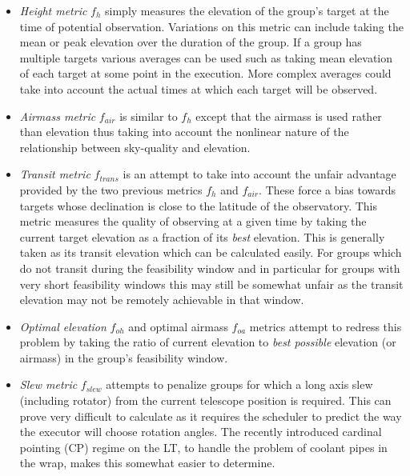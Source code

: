 \begin{itemize}
 
\item \emph{Height metric} $f_h$  simply measures the elevation of the group's target at the time of potential observation. Variations on this metric can include taking the mean or peak elevation over the duration of the group. If a group has multiple targets various averages can be used such as taking mean elevation of each target at some point in the execution. More complex averages could take into account the actual times at which each target will be observed. 
 
\item \emph{Airmass metric} $f_{air}$  is similar to $f_h$ except that the airmass is used rather than elevation thus taking into account the nonlinear nature of the relationship between sky-quality and elevation.

\item \emph{Transit metric} $f_{trans}$  is an attempt to take into account the unfair advantage provided by the two previous metrics $f_h$ and $f_{air}$. These force a bias towards targets whose declination is close to the latitude of the observatory. This metric measures the quality of observing at a given time by taking the current target elevation as a fraction of its \emph{best} elevation. This is generally taken as its transit elevation which can be calculated easily. For groups which do not transit during the feasibility window and in particular for groups with very short feasibility windows this may still be somewhat unfair as the transit elevation may not be remotely achievable in that window.

\item \emph{Optimal elevation} $f_{oh}$ and optimal airmass $f_{oa}$ metrics attempt to redress this problem by taking the ratio of current elevation to \emph{best possible} elevation (or airmass) in the group's feasibility window.  

\item \emph{Slew metric} $f_{slew}$  attempts to penalize groups for which a long axis slew (including rotator) from the current telescope position is required. This can prove very difficult to calculate as it requires the scheduler to predict the way the executor will choose rotation angles. The recently introduced cardinal pointing (CP) regime on the LT, to handle the problem of coolant pipes in the wrap, makes this somewhat easier to determine.


\end{itemize}
